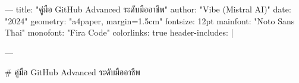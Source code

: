 ---
title: "คู่มือ GitHub Advanced ระดับมืออาชีพ"
author: "Vibe (Mistral AI)"
date: "2024"
geometry: "a4paper, margin=1.5cm"
fontsize: 12pt
mainfont: "Noto Sans Thai"
monofont: "Fira Code"
colorlinks: true
header-includes: |
  \usepackage{xcolor}
---

# คู่มือ GitHub Advanced ระดับมืออาชีพ
